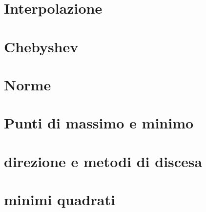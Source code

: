 \documentclass{article}
\begin{document}
	\section{Interpolazione}
	\section{Chebyshev}
	\section{Norme}
	\section{Punti di massimo e minimo}
	\section{direzione e metodi di discesa}
	\section{minimi quadrati}
\end{document}
